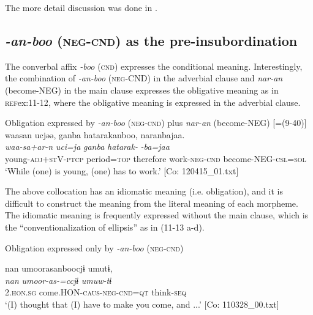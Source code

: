 The more detail discussion was done in .

\subsection{\textit{{}-an-boo} (\textsc{neg}-\textsc{cnd}) as the pre-insubordination}\label{sec:11.2.4}

The converbal affix \textit{{}-boo} (\textsc{cnd}) expresses the conditional meaning. Interestingly, the combination of \textit{{}-an-boo} (\textsc{neg}-CND) in the adverbial clause and \textit{nar-an} (become-NEG) in the main clause expresses the obligative meaning as in \textsc{ref}{ex:11-12}, where the obligative meaning is expressed in the adverbial clause.

\ea\label{ex:11-12}  Obligation expressed by \textit{{}-an-boo} (\textsc{neg}-\textsc{cnd}) plus \textit{nar-an} (become-NEG) [=(9-40)]\\
  
      \glll    waasan  ucjəə,  ganba  hatarakanboo, naranbajaa.\\
    \textit{waa-sa+ar-n}  \textit{uci=ja}  \textit{ganba}  \textit{hatarak-} \textit{-ba=jaa}\\
    young-\textsc{adj}+\textsc{st}V-\textsc{ptcp}  period=\textsc{top}  therefore  work-\textsc{neg}-\textsc{cnd}  become-NEG-\textsc{csl}=\textsc{sol}\\
    \glt ‘While (one) is young, (one) has to work.’     [Co: 120415\_01.txt]
\z

The above collocation has an idiomatic meaning (i.e. obligation), and it is difficult to construct the meaning from the literal meaning of each morpheme. The idiomatic meaning is frequently expressed without the main clause, which is the “conventionalization of ellipsis” \citep[372-373]{Evans2007} as in (11-13 a-d).

\ea\label{ex:11-13}  Obligation expressed only by \textit{{}-an-boo} (\textsc{neg}-\textsc{cnd})

  \ea\relax  [= (8-122 b)]

    
      \glll    nan  umoorasanboocjɨ  umutɨ,\\
      \textit{nan}  \textit{umoor-as-=ccjɨ}  \textit{umuw-tɨ}\\
      2.\textsc{hon}.\textsc{sg}  come.HON-\textsc{caus}-\textsc{neg}-\textsc{cnd}=\textsc{qt}  think-\textsc{seq}\\
      \glt       ‘(I) thought that (I) have to make you come, and ...’ [Co: 110328\_00.txt]

